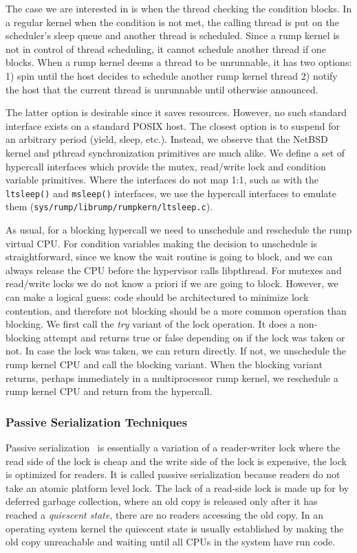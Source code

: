 The case we are interested in is when the thread checking the condition
blocks.  In a regular kernel when the condition is not met, the calling
thread is put on the scheduler's sleep queue and another thread is
scheduled.  Since a rump kernel is not in control of thread scheduling,
it cannot schedule another thread if one blocks.  When a rump kernel
deems a thread to be unrunnable, it has two options: 1) spin until the
host decides to schedule another rump kernel thread 2) notify the host
that the current thread is unrunnable until otherwise announced.

The latter option is desirable since it saves resources.  However,
no such standard interface exists on a standard POSIX host.  The
closest option is to suspend for an arbitrary period (yield, sleep,
etc.).  Instead, we observe that the NetBSD kernel and pthread
synchronization primitives are much alike.  We define a set of
hypercall interfaces which provide the mutex, read/write lock and
condition variable primitives.  Where the interfaces do not map
1:1, such as with the \texttt{ltsleep()} and \texttt{msleep()}
interfaces, we use the hypercall interfaces to emulate them
(\verb+sys/rump/librump/rumpkern/ltsleep.c+).

As usual, for a blocking hypercall we need to unschedule and
reschedule the rump virtual CPU.  For condition variables making the
decision to unschedule is
straightforward, since we know the wait routine is going to block,
and we can always release the CPU before the hypervisor calls libpthread.
For mutexes and read/write locks we do not know a priori if we are
going to block.  However, we can make a logical guess: code should
be architectured to minimize lock contention, and therefore not
blocking should be a more common operation than blocking.  We first
call the \textit{try} variant of the lock operation.  It does a
non-blocking attempt and returns true or false depending on if the
lock was taken or not.  In case the lock was taken, we can return
directly.  If not, we unschedule the rump kernel CPU and call the
blocking variant.  When the blocking variant returns, perhaps
immediately in a multiprocessor rump kernel, we reschedule a rump
kernel CPU and return from the hypercall.

\subsubsection{Passive Serialization Techniques}
\label{sect:passiveser}

Passive serialization~\cite{hennessy:passiveser} is essentially a
variation of a reader-writer lock where the read side of the lock is
cheap and the write side of the lock is expensive, \ie the lock is
optimized for readers.  It is called passive serialization because
readers do not take an atomic platform level lock.  The lack of a
read-side lock is made up
for by deferred garbage collection, where an old copy is released
only after it has reached a \textit{quiescent state}, \ie there are
no readers accessing the old copy.  In an operating system kernel
the quiescent state is usually established by making the old copy
unreachable and waiting until all CPUs in the system have run code.

